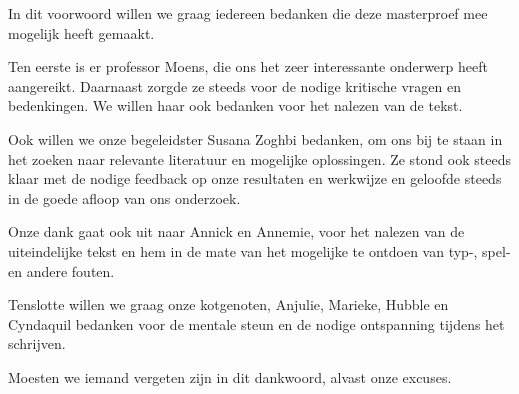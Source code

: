 \documentclass[master=cws,masteroption=ai]{kulemt}
\begin{document}
\begin{preface}
In dit voorwoord willen we graag iedereen bedanken die deze masterproef mee mogelijk heeft gemaakt.

Ten eerste is er professor Moens, die ons het zeer interessante onderwerp heeft aangereikt. Daarnaast zorgde ze steeds voor de nodige kritische vragen en bedenkingen. We willen haar ook bedanken voor het nalezen van de tekst.

Ook willen we onze begeleidster Susana Zoghbi bedanken, om ons bij te staan in het zoeken naar relevante literatuur en mogelijke oplossingen. Ze stond ook steeds klaar met de nodige feedback op onze resultaten en werkwijze en geloofde steeds in de goede afloop van ons onderzoek.

Onze dank gaat ook uit naar Annick en Annemie, voor het nalezen van de uiteindelijke tekst en hem in de mate van het mogelijke te ontdoen van typ-, spel- en andere fouten. 

Tenslotte willen we graag onze kotgenoten, Anjulie, Marieke, Hubble en Cyndaquil bedanken voor de mentale steun en de nodige ontspanning tijdens het schrijven.

Moesten we iemand vergeten zijn in dit dankwoord, alvast onze excuses.

\end{preface}

\tableofcontents*
\end{document}
